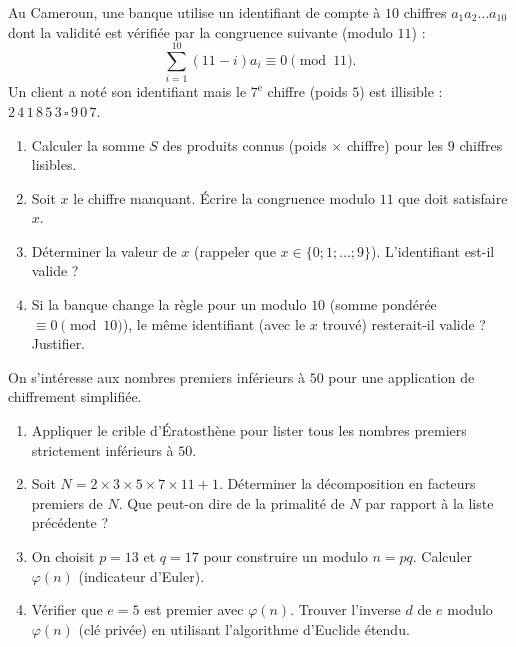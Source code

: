 \documentclass[11pt]{article}
\begin{document}
\begin{exercice}
Au Cameroun, une banque utilise un identifiant de compte à $10$ chiffres $a_1 a_2 \dots a_{10}$ dont la validité est vérifiée par la congruence suivante (modulo $11$) :
\[
\sum_{i=1}^{10} (11-i) a_i \equiv 0 \pmod{11}.
\]
Un client a noté son identifiant mais le $7^{\text{e}}$ chiffre (poids $5$) est illisible : $2\,4\,1\,8\,5\,3\,\square\,9\,0\,7$.
\begin{enumerate}
    \item Calculer la somme $S$ des produits connus (poids $\times$ chiffre) pour les $9$ chiffres lisibles.
    \item Soit $x$ le chiffre manquant. Écrire la congruence modulo $11$ que doit satisfaire $x$.
    \item Déterminer la valeur de $x$ (rappeler que $x \in \{0;1;\dots;9\}$). L'identifiant est-il valide ?
    \item Si la banque change la règle pour un modulo $10$ (somme pondérée $\equiv 0 \pmod{10}$), le même identifiant (avec le $x$ trouvé) resterait-il valide ? Justifier.
\end{enumerate}
\end{exercice}

\begin{exercice}
On s'intéresse aux nombres premiers inférieurs à $50$ pour une application de chiffrement simplifiée.
\begin{enumerate}
    \item Appliquer le crible d'Ératosthène pour lister tous les nombres premiers strictement inférieurs à $50$.
    \item Soit $N = 2 \times 3 \times 5 \times 7 \times 11 + 1$. Déterminer la décomposition en facteurs premiers de $N$. Que peut-on dire de la primalité de $N$ par rapport à la liste précédente ?
    \item On choisit $p=13$ et $q=17$ pour construire un modulo $n = pq$. Calculer $\varphi(n)$ (indicateur d'Euler).
    \item Vérifier que $e=5$ est premier avec $\varphi(n)$. Trouver l'inverse $d$ de $e$ modulo $\varphi(n)$ (clé privée) en utilisant l'algorithme d'Euclide étendu.
\end{enumerate}
\end{exercice}
\end{document}
